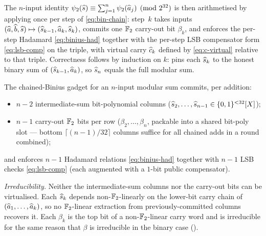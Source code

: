 The $n$-input identity
$\psi_2(\widehat{s}) \equiv \sum_{j=1}^{n} \psi_2(\widehat{a}_j) \pmod{2^{32}}$
is then arithmetised by applying  once per step of
\eqref{eq:bin-chain}: step~$k$ takes inputs $(\widehat{a}, \widehat{b}, \widehat{s})
\mapsto (\widehat{s}_{k-1}, \widehat{a}_k, \widehat{s}_k)$, commits one $\mathbb{F}_2$
carry-out bit $\beta_k$, and enforces the per-step Hadamard
\eqref{eq:binius-had} together with the per-step LSB compensator form
\eqref{eq:lsb-comp} on the triple, with virtual carry $\widehat{c}_k$
defined by \eqref{eq:c-virtual} relative to that triple. Correctness
follows by induction on $k$:  pins each $\widehat{s}_k$
to the honest binary sum of $(\widehat{s}_{k-1}, \widehat{a}_k)$, so $\widehat{s}_n$
equals the full modular sum.

\begin{proposition}
\label{prop:binius-chain-count}
The chained-Binius gadget for an $n$-input modular sum commits, per
addition:
\begin{itemize}[leftmargin=2em,topsep=2pt]
  \item $n - 2$ intermediate-sum bit-polynomial columns
        ($\widehat{s}_2, \dots, \widehat{s}_{n-1} \in \{0,1\}^{<32}[X]$);
  \item $n - 1$ carry-out $\mathbb{F}_2$ bits per row
        ($\beta_2, \dots, \beta_n$, packable into a shared bit-poly
        slot — bottom $\lceil (n-1)/32 \rceil$ columns suffice for
        all chained adds in a round combined);
\end{itemize}
and enforces $n - 1$ Hadamard relations \eqref{eq:binius-had} together
with $n - 1$ LSB checks \eqref{eq:lsb-comp} (each augmented with a
$1$-bit public compensator).

\emph{Irreducibility.} Neither the intermediate-sum columns nor the
carry-out bits can be virtualised. Each $\widehat{s}_k$ depends
non-$\mathbb{F}_2$-linearly on the lower-bit carry chain of
$(\widehat{a}_1, \dots, \widehat{a}_k)$, so no $\mathbb{F}_2$-linear extraction from
previously-committed columns recovers it. Each $\beta_k$ is the top
bit of a non-$\mathbb{F}_2$-linear carry word and is irreducible for the same
reason that $\beta$ is irreducible in the binary case
().
\end{proposition}

